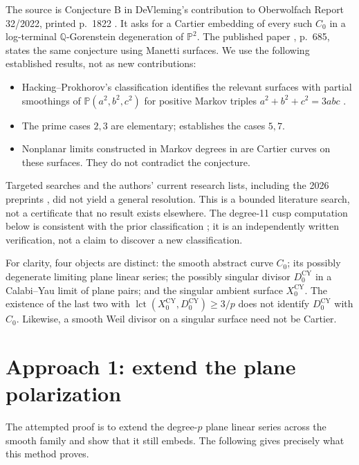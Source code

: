 \documentclass[11pt]{article}
\theoremstyle{remark}\newtheorem{remark}[theorem]{Remark}
\newcommand{\PP}{\mathbb P}\newcommand{\CC}{\mathbb C}\newcommand{\ZZ}{\mathbb Z}
\newcommand{\lct}{\operatorname{lct}}\newcommand{\Sing}{\operatorname{Sing}}
\begin{document}
The source is Conjecture B in DeVleming's contribution to Oberwolfach Report 32/2022, printed p.~1822 \cite{OWR}. It asks for a Cartier embedding of every such $C_0$ in a log-terminal $\mathbb Q$-Gorenstein degeneration of $\PP^2$. The published paper \cite{DS}, p.~685, states the same conjecture using Manetti surfaces. We use the following established results, not as new contributions:
\begin{itemize}
\item Hacking--Prokhorov's classification identifies the relevant surfaces with partial smoothings of $\PP(a^2,b^2,c^2)$ for positive Markov triples $a^2+b^2+c^2=3abc$ \cite[Cor.~1.2]{HP}.
\item The prime cases $2,3$ are elementary; \cite[Thms.~D,E]{DS} establishes the cases $5,7$.
\item Nonplanar limits constructed in Markov degrees in \cite[Thm.~1.10]{DS} are Cartier curves on these surfaces. They do not contradict the conjecture.
\end{itemize}
Targeted searches and the authors' current research lists, including the 2026 preprints \cite{DLT,DW}, did not yield a general resolution. This is a bounded literature search, not a certificate that no result exists elsewhere. The degree-11 cusp computation below is consistent with the prior classification \cite[Thm.~5.1]{DSi}; it is an independently written verification, not a claim to discover a new classification.

For clarity, four objects are distinct: the smooth abstract curve $C_0$; its possibly degenerate limiting plane linear series; the possibly singular divisor $D^{\mathrm{CY}}_0$ in a Calabi--Yau limit of plane pairs; and the singular ambient surface $X^{\mathrm{CY}}_0$. The existence of the last two with $\lct(X^{\mathrm{CY}}_0,D^{\mathrm{CY}}_0)\geq3/p$ does not identify $D^{\mathrm{CY}}_0$ with $C_0$. Likewise, a smooth Weil divisor on a singular surface need not be Cartier.

\section{Approach 1: extend the plane polarization}
The attempted proof is to extend the degree-$p$ plane linear series across the smooth family and show that it still embeds. The following gives precisely what this method proves.
\end{document}
